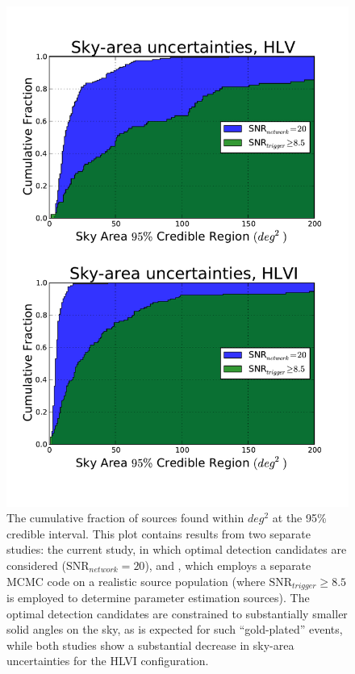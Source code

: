 \documentclass[11pt,a4paper]{emulateapj} 
\begin{document}
\begin{figure}[ht!]
  \centering \includegraphics[angle=0,scale=0.58, trim=0.5cm 1cm 0cm 0cm]{comparitiveSkyAreas.pdf}
  
 \caption{The cumulative fraction of sources found within $deg^2$ at the 95\% credible
 interval.  This plot contains results from two separate studies: the current study, in
 which optimal detection candidates are considered ($\text{SNR}_{network}=20$), 
and \cite{Nissanke2013}, which employs a separate MCMC code on a
 realistic source population (where $\text{SNR}_{trigger} \geq 8.5$ is employed to determine
 parameter estimation sources).  The optimal detection candidates are constrained
 to substantially smaller solid angles on the sky, as is expected for such ``gold-plated''
 events, while both studies show a substantial decrease in sky-area uncertainties for the HLVI configuration.}
 \label{compSky}
\end{figure}
\end{document}
